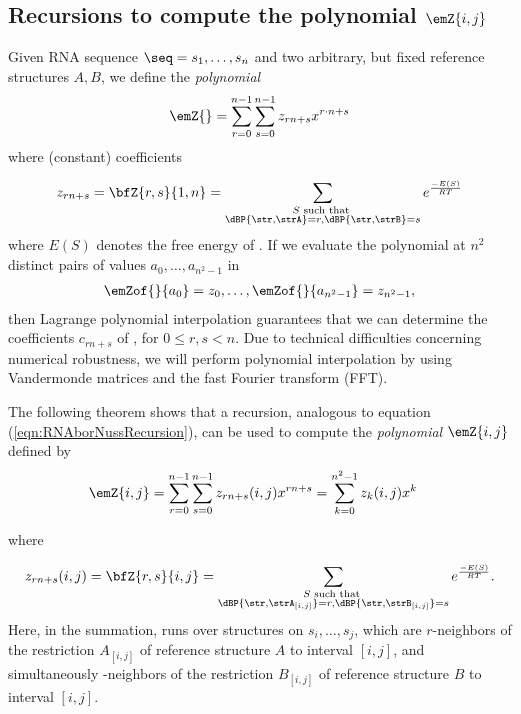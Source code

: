 \subsection{Recursions to compute the polynomial $\emZ{i,j}$}
\label{section:recursionsForPolynomialZij}

Given RNA sequence $\seq = s_1,\ldots,s_n$
and two arbitrary, but fixed reference
structures $A,B$, we define the {\em polynomial}
\begin{align}
\label{eqn:polynomialYann}
\emZ{} = \sum_{r=0}^{n-1} \sum_{s=0}^{n-1}  z_{rn+s} x^{r\cdot n + s}
\end{align}
where (constant) coefficients

\begin{align} z_{rn+s}= \bfZ{r,s}{1,n} =
\sum_{\substack{S \text{ such that }\\
\dBP{\str,\strA}=r, \dBP{\str,\strB}=s}}
e^{\frac{-E(S)}{RT}}
\end{align}
where $E(S)$ denotes the free energy of \str.
If we evaluate the polynomial \emZ{} at $n^2$ distinct pairs of values
$a_0,\ldots,a_{n^2-1}$ in
\begin{align}
\label{eqn:ZofX}
\emZof{}{a_{0}} = z_{0},\ldots, \emZof{}{a_{n^2-1}} = z_{n^2-1},
\end{align}
then Lagrange polynomial interpolation
guarantees that we can determine the coefficients $c_{rn+s}$ of \emZ{},
for $0\leq r,s < n$. Due to technical difficulties concerning numerical
robustness, we will perform polynomial interpolation by using Vandermonde
matrices and the fast Fourier transform (FFT).

The following theorem shows that a
recursion, analogous to equation (\ref{eqn:RNAborNussRecursion}),
can be used to compute
the {\em polynomial} $\emZ{i,j}$ defined by
\begin{align}
\label{eqn:defZijpolynomial}
\emZ{i,j} &= \sum_{r=0}^{n-1} \sum_{s=0}^{n-1}
z_{rn+s}(i,j) x^{rn+s}
=\sum_{k=0}^{n^2-1} z_{k}(i,j) x^{k}
\end{align}

where

\begin{align} z_{rn+s}(i,j)= \bfZ{r,s}{i,j} =
\sum_{\substack{S \text{ such that }\\
\dBP{\str,\strA_{[i,j]}}=r, \dBP{\str,\strB_{[i,j]}}=s}}
e^{\frac{-E(S)}{RT}}.
\end{align}
Here, in the summation, \str runs over structures on $s_i,\ldots,s_j$, which
are $r$-neighbors of the restriction $A_{[i,j]}$ of reference structure
$A$ to interval $[i,j]$, and simultaneously
\str-neighbors of the restriction $B_{[i,j]}$ of reference structure
$B$ to interval $[i,j]$.
\medskip

